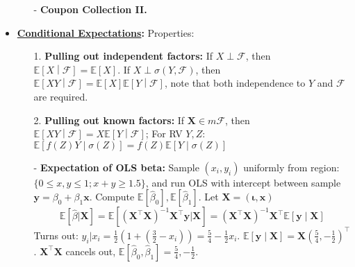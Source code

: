 \documentclass[9pt, landscape]{article}
\begin{document}
\begin{multicols*}{3}
\begin{itemize}
\begin{itemize}[leftmargin=10pt,noitemsep,topsep=0pt,partopsep=0pt]
		\item[-]  \textbf{Coupon Collection II.}
	\end{itemize}
	\item \textbf{\href{https://en.wikipedia.org/wiki/Conditional_expectation}{Conditional Expectations}:} Properties: 
	\begin{itemize}[leftmargin=10pt,noitemsep,topsep=0pt,partopsep=0pt]
		\item[1.] \textbf{Pulling out independent factors:} If $X \perp \mathcal{F}$, then $\mathbb{E}\left[X\middle|\mathcal{F}\right] = \mathbb{E}\left[X\right]$. If $X \perp \sigma(Y, \mathcal{F})$, then $\mathbb{E}\left[XY\middle|\mathcal{F}\right] = \mathbb{E}\left[X\right] \mathbb{E}\left[Y\middle|\mathcal{F}\right]$, note that both independence to $Y$ and $\mathcal{F}$ are required.
		\item[2.] \textbf{Pulling out known factors:} If $\bm{X} \in m \mathcal{F}$, then $\mathbb{E}\left[XY\middle|\mathcal{F}\right] = X \mathbb{E}\left[Y\middle|\mathcal{F}\right]$; For RV $Y, Z$: $\mathbb{E}\left[f(Z) Y\middle|\sigma(Z)\right] = f(Z) \mathbb{E}\left[Y\middle|\sigma(Z)\right]$
	\end{itemize}
	\begin{itemize}[leftmargin=10pt,noitemsep,topsep=0pt,partopsep=0pt]
		\item[-] \textbf{Expectation of OLS beta:} Sample $(x_i, y_i)$ uniformly from region: $\{0 \leq x,y\leq1; x+y \geq 1.5\}$, and run OLS with intercept between sample $\bm{y}= \beta_0  + \beta_1\bm{x}$. Compute $\mathbb{E}[\widehat{\beta}_0], \mathbb{E}[\widehat{\beta}_1]$. Let $\bm{X} = (\bm{\iota}, \bm{x})$
		$$
		\mathbb{E}\left[\widehat{\beta} | \bm{X}\right] = \mathbb{E}\left[ (\bm{X}^{\top} \bm{X})^{-1} \bm{X}^{\top} \bm{y} | \bm{X} \right] = (\bm{X}^{\top} \bm{X})^{-1} \bm{X}^{\top} \mathbb{E}\left[\bm{y}\middle|\bm{X}\right]
		$$
		Turns out: $y_i | x_i = \frac{1}{2}(1+(\frac{3}{2}-x_i)) = \frac{5}{4} - \frac{1}{2}x_i$. $\mathbb{E}\left[\bm{y}\middle|\bm{X}\right] = \bm{X}(\frac{5}{4}, -\frac{1}{2})^{\top}$. $\bm{X}^{\top} \bm{X}$ cancels out, $\mathbb{E}[\widehat{\beta}_0, \widehat{\beta}_1] = \frac{5}{4}, -\frac{1}{2}$.
	\end{itemize}
\end{itemize}

\end{multicols*}
\end{document}
